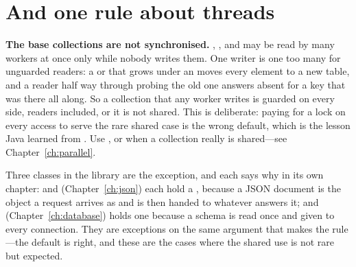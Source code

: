 \section{And one rule about threads}

\begin{stwarn}
\textbf{The base collections are not synchronised.} ,
,  and  may be read by many workers at once
only while nobody writes them. One writer is one too many for unguarded
readers: a  or  that grows under an 
moves every element to a new table, and a reader half way through probing
the old one answers absent for a key that was there all along. So a
collection that any worker writes is guarded on every side, readers
included, or it is not shared. This is deliberate: paying for a lock on
every access to serve the rare shared case is the wrong default, which is
the lesson Java learned from . Use ,  or
 when a collection really is shared---see
Chapter~\ref{ch:parallel}.
\end{stwarn}

Three classes in the library are the exception, and each says why in its own
chapter:  and 
(Chapter~\ref{ch:json}) each hold a , because a JSON document is
the object a request arrives as and is then handed to whatever answers it; and
 (Chapter~\ref{ch:database}) holds one because a schema is
read once and given to every connection. They are exceptions on the same
argument that makes the rule---the default is right, and these are the cases
where the shared use is not rare but expected.
